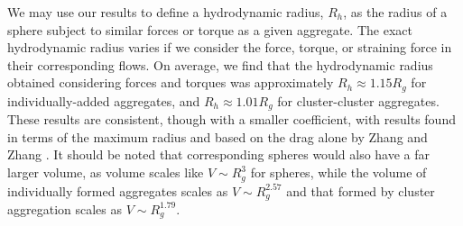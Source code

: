 \begin{table}[ht]
 \caption{Summary of results from section \ref{sec:results} compared to corresponding results for a sphere. 
 }
 \label{table_sum}
 \end{table}


We may use our results to define a hydrodynamic radius, $R_h$, as the radius of a sphere subject to similar forces or torque as a given aggregate. The exact hydrodynamic radius varies if we consider the force, torque, or straining force in their corresponding flows. On average, we find that the hydrodynamic radius obtained considering forces and torques was approximately $R_h \approx 1.15 R_g$ for individually-added aggregates, and $R_h \approx 1.01 R_g$ for cluster-cluster aggregates. These results are consistent, though with a smaller coefficient, with results found in terms of the maximum radius and based on the drag alone by Zhang and Zhang \cite{zhang_direct_2015}.
It should be noted that corresponding spheres would also have a far larger volume, as volume scales like $V \sim R_g^3$ for spheres, while the volume of individually formed aggregates scales as $V \sim R_g^{2.57}$ and that formed by cluster aggregation scales as $V \sim R_g^{1.79}$. 

